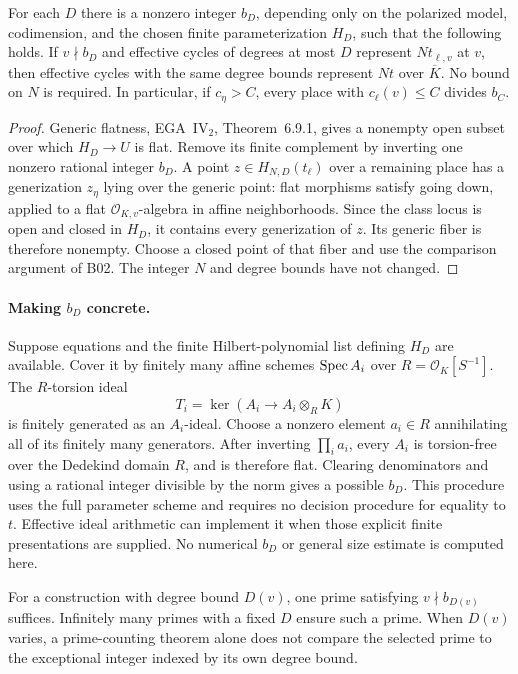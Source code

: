 \begin{proposition}
For each $D$ there is a nonzero integer $b_D$, depending only on the
polarized model, codimension, and the chosen finite parameterization
$H_D$, such that the following holds. If $v\nmid b_D$ and effective cycles
of degrees at most $D$ represent $Nt_{\ell,v}$ at $v$, then effective
cycles with the same degree bounds represent $Nt$ over $\overline K$.
No bound on $N$ is required. In particular, if $c_\eta>C$, every place
with $c_\ell(v)\leq C$ divides $b_C$.
\end{proposition}

\begin{proof}
Generic flatness, EGA~IV$_2$, Theorem~6.9.1, gives a nonempty open subset
over which $H_D\to U$ is flat. Remove its finite complement by inverting
one nonzero rational integer $b_D$. A point $z\in H_{N,D}(t_\ell)$ over a
remaining place has a generization $z_\eta$ lying over the generic point:
flat morphisms satisfy going down, applied to a flat
$\mathcal O_{K,v}$-algebra in affine neighborhoods. Since the class locus
is open and closed in $H_D$, it contains every generization of $z$.
Its generic fiber is therefore nonempty. Choose a closed point of that
fiber and use the comparison argument of B02. The integer $N$ and degree
bounds have not changed.
\end{proof}

\paragraph{Making $b_D$ concrete.}
Suppose equations and the finite Hilbert-polynomial list defining $H_D$
are available. Cover it by finitely many affine schemes
$\operatorname{Spec} A_i$ over $R=\mathcal O_K[S^{-1}]$. The $R$-torsion ideal
\[
 T_i=\ker(A_i\longrightarrow A_i\otimes_RK)
\]
is finitely generated as an $A_i$-ideal. Choose a nonzero element $a_i\in R$
annihilating all of its finitely many generators. After inverting
$\prod_i a_i$, every $A_i$ is torsion-free over the Dedekind domain $R$,
and is therefore flat. Clearing denominators and using a rational integer
divisible by the norm gives a possible $b_D$. This procedure uses the full
parameter scheme and requires no decision procedure for equality to $t$.
Effective ideal arithmetic can implement it when those explicit finite
presentations are supplied. No numerical $b_D$ or general size estimate is
computed here.

For a construction with degree bound $D(v)$, one prime satisfying
$v\nmid b_{D(v)}$ suffices. Infinitely many primes with a fixed $D$ ensure
such a prime. When $D(v)$ varies, a prime-counting theorem alone does not
compare the selected prime to the exceptional integer indexed by its own
degree bound.

